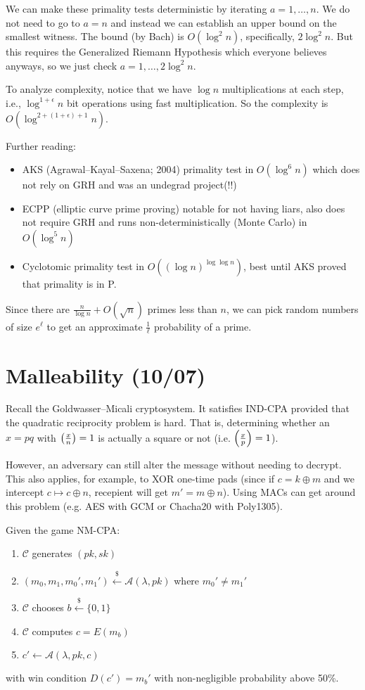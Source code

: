 \documentclass[notes]{agony}
\newcommand{\xgets}{\xleftarrow}
\newcommand{\leg}[2]{\qty(\frac{#1}{#2})}
\begin{document}
We can make these primality tests deterministic by iterating $a = 1,\dotsc,n$.
We do not need to go to $a=n$ and instead
we can establish an upper bound on the smallest witness.
The bound (by Bach) is $O(\log^2 n)$, specifically, $2\log^2n$.
But this requires the Generalized Riemann Hypothesis
which everyone believes anyways, so we just check $a = 1,\dotsc,2\log^2 n$.

To analyze complexity, notice that we have $\log n$ multiplications at each step,
i.e., $\log^{1+\epsilon} n$ bit operations using fast multiplication.
So the complexity is $O(\log^{2 + (1 + \epsilon) + 1} n)$.

Further reading:
\begin{itemize}[nosep]
  \item AKS (Agrawal--Kayal--Saxena; 2004) primality test in $O(\log^6 n)$
        which does not rely on GRH and was an undegrad project(!!)
  \item ECPP (elliptic curve prime proving) notable for not having liars,
        also does not require GRH and runs non-deterministically (Monte Carlo)
        in $O(\log^5 n)$
  \item Cyclotomic primality test in $O((\log n)^{\log \log n})$,
        best until AKS proved that primality is in P.
\end{itemize}

Since there are $\frac{n}{\log n} + O(\sqrt n)$ primes less than $n$,
we can pick random numbers of size $e^\ell$ to get an approximate $\frac{1}{\ell}$
probability of a prime.

\section{Malleability (10/07)}
Recall the Goldwasser--Micali cryptosystem.
It satisfies IND-CPA provided that the quadratic reciprocity problem is hard.
That is, determining whether an $x = pq$ with $\leg{x}{n} = 1$
is actually a square or not (i.e. $\leg{x}{p} = 1$).

However, an adversary can still alter the message without needing to decrypt.
This also applies, for example, to XOR one-time pads (since if $c = k \oplus m$
and we intercept $c \mapsto c \oplus n$, recepient will get $m' = m \oplus n$).
Using MACs can get around this problem (e.g. AES with GCM or Chacha20 with Poly1305).

\begin{defn}
  Given the game NM-CPA:
  \begin{enumerate}[1.,nosep]
    \item $\mathcal C$ generates $(pk,sk)$
    \item $(m_0, m_1, m_0', m_1') \xgets{\$} \mathcal A(\lambda, pk)$ where $m_0' \neq m_1'$
    \item $\mathcal C$ chooses $b \xgets{\$} \{0,1\}$
    \item $\mathcal C$ computes $c = E(m_b)$
    \item $c' \gets \mathcal A(\lambda, pk, c)$
  \end{enumerate}
  with win condition $D(c') = m_b'$ with non-negligible probability above 50\%.
\end{defn}
\end{document}
